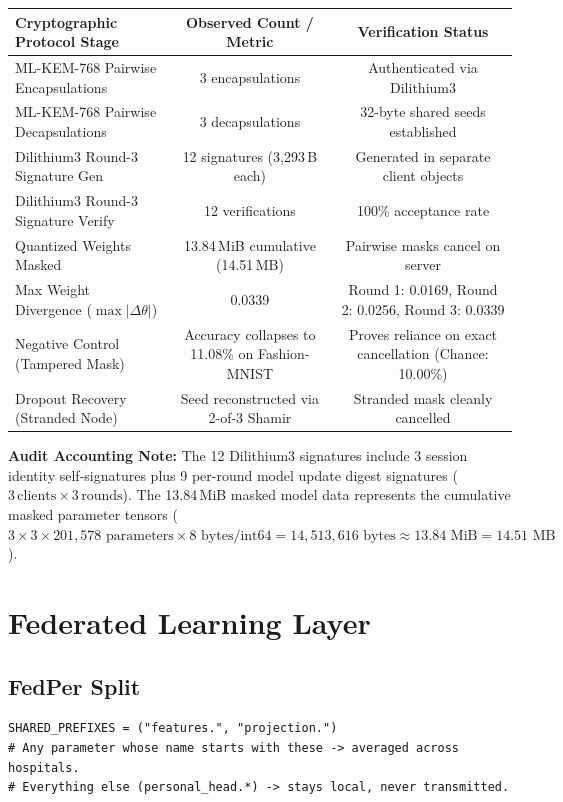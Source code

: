 \documentclass[11pt,a4paper]{article}
\begin{document}
\begin{center}
\begin{longtable}{@{}p{5.8cm}cc@{}}
\toprule
\textbf{Cryptographic Protocol Stage} & \textbf{Observed Count / Metric} & \textbf{Verification Status} \\
\midrule
\endhead
ML-KEM-768 Pairwise Encapsulations   & 3 encapsulations & Authenticated via Dilithium3 \\
ML-KEM-768 Pairwise Decapsulations   & 3 decapsulations & 32-byte shared seeds established \\
Dilithium3 Round-3 Signature Gen     & 12 signatures (3{,}293\,B each) & Generated in separate client objects \\
Dilithium3 Round-3 Signature Verify  & 12 verifications & 100\% acceptance rate \\
Quantized Weights Masked             & 13.84\,MiB cumulative (14.51\,MB) & Pairwise masks cancel on server \\
Max Weight Divergence ($\max |\Delta \theta|$) & 0.0339 & Round 1: 0.0169, Round 2: 0.0256, Round 3: 0.0339 \\
Negative Control (Tampered Mask)     & Accuracy collapses to 11.08\% on Fashion-MNIST & Proves reliance on exact cancellation (Chance: 10.00\%) \\
Dropout Recovery (Stranded Node)     & Seed reconstructed via 2-of-3 Shamir & Stranded mask cleanly cancelled \\
\bottomrule
\end{longtable}
\end{center}

\noindent\textbf{Audit Accounting Note:} The 12 Dilithium3 signatures include 3 session identity self-signatures plus 9 per-round model update digest signatures ($3\,\text{clients} \times 3\,\text{rounds}$). The 13.84\,MiB masked model data represents the cumulative masked parameter tensors ($3 \times 3 \times 201{,}578\text{ parameters} \times 8\text{ bytes/int64} = 14{,}513{,}616\text{ bytes} \approx 13.84\text{ MiB} = 14.51\text{ MB}$).

\section{Federated Learning Layer}

\subsection{FedPer Split}
\begin{lstlisting}
SHARED_PREFIXES = ("features.", "projection.")
# Any parameter whose name starts with these -> averaged across hospitals.
# Everything else (personal_head.*) -> stays local, never transmitted.
\end{lstlisting}
\end{document}

